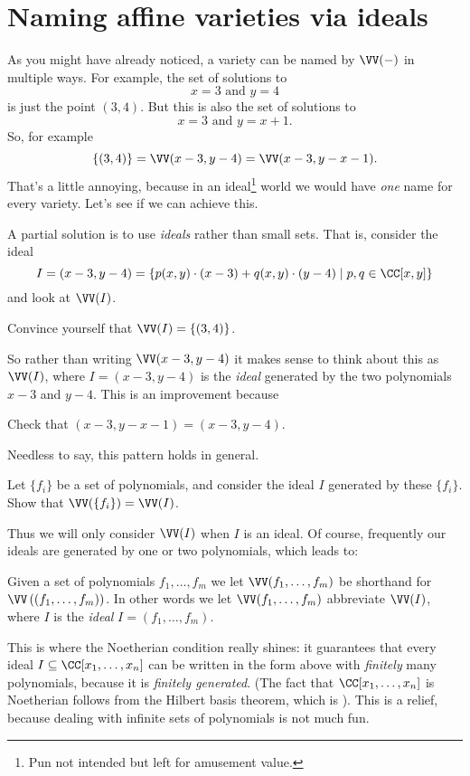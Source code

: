 \section{Naming affine varieties via ideals}
As you might have already noticed, a variety can be named by $\VV(-)$ in multiple ways.
For example, the set of solutions to
\[ x=3 \text{ and } y=4 \]
is just the point $(3,4)$.
But this is also the set of solutions to
\[ x=3 \text{ and } y=x+1. \]
So, for example
\[ \{(3,4)\}
	= \VV(x-3, y-4)
	= \VV(x-3, y-x-1).
	\]
That's a little annoying, because in an ideal\footnote{Pun not intended
	but left for amusement value.}
world we would have \emph{one} name
for every variety.
Let's see if we can achieve this.

A partial solution is to use \emph{ideals} rather than small sets.
That is, consider the ideal
\[
	I = \left( x-3, y-4 \right)
	= \left\{ p(x,y) \cdot (x-3) + q(x,y) \cdot (y-4)
	\mid p,q \in \CC[x,y] \right\}
\]
and look at $\VV(I)$.
\begin{ques}
	Convince yourself that $\VV(I) = \{(3,4)\}$.
\end{ques}
So rather than writing $\VV(x-3, y-4)$ it makes sense to
think about this as $\VV( I )$, where $I = (x-3,y-4)$ is the \emph{ideal}
generated by the two polynomials $x-3$ and $y-4$.
This is an improvement because
\begin{ques}
	Check that $(x-3, y-x-1) = (x-3, y-4)$.
\end{ques}

Needless to say, this pattern holds in general.
\begin{ques}
	Let $\{f_i\}$ be a set of polynomials, and consider
	the ideal $I$ generated by these $\{f_i\}$.
	Show that $\VV(\{f_i\}) = \VV(I)$.
\end{ques}

Thus we will only consider $\VV(I)$ when $I$ is an ideal.
Of course, frequently our ideals are generated by one or two polynomials,
which leads to:
\begin{abuse}
	Given a set of polynomials $f_1, \dots, f_m$
	we let $\VV(f_1, \dots, f_m)$ be shorthand for
	$\VV\left( \left( f_1, \dots, f_m \right) \right)$.
	In other words we let $\VV(f_1, \dots, f_m)$
	abbreviate $\VV(I)$, where $I$ is the \emph{ideal} $I=(f_1, \dots, f_m)$.
\end{abuse}

This is where the Noetherian condition really shines:
it guarantees that every ideal $I \subseteq \CC[x_1, \dots, x_n]$
can be written in the form above with \emph{finitely} many polynomials,
because it is \emph{finitely generated}.
(The fact that $\CC[x_1, \dots, x_n]$ is Noetherian follows from the Hilbert basis theorem,
which is ).
This is a relief, because dealing with infinite sets of polynomials is not much fun.

